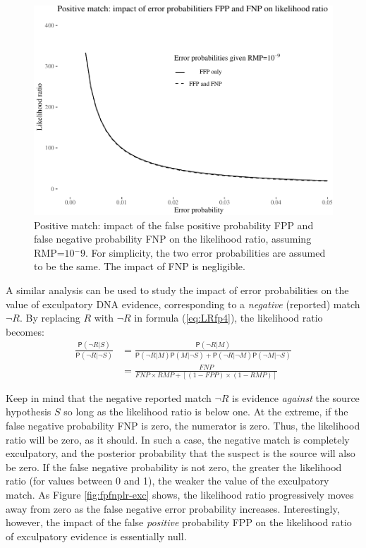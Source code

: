 \documentclass[
  10pt,
  dvipsnames,enabledeprecatedfontcommands]{scrartcl}
\newcommand{\n}{\neg}
\newcommand{\pr}[1]{\mathsf{P}(#1)}
\begin{document}
\begin{figure}

\begin{center}\includegraphics[width=1\linewidth]{lr-chapter4_files/figure-latex/fig-fpfnplr-1} \end{center}
\caption{Positive match: impact of the false positive probability FPP and false negative probability FNP on the likelihood ratio, assuming RMP=$10{^-9}$. For simplicity, the two error probabilities are assumed to be the same. The impact of FNP is negligible.}
\label{fig:fpfnplr}
\end{figure}

A similar analysis can be used to study the impact of error
probabilities on the value of exculpatory DNA evidence, corresponding to
a \textit{negative} (reported) match \(\neg R\). By replacing \(R\) with
\(\neg R\) in formula (\ref{eq:LRfp4}), the likelihood ratio becomes:
\begin{align}
\label{eq:LR-match-exc}
\frac{\pr{\neg R \vert S}}{\pr{\neg R \vert \neg S}} & = 
\frac{\pr{\neg R \vert M}}{\pr{\neg R \vert M }\pr{M \vert \n S} + \pr{\neg R \vert \n M}\pr{\n M \vert \n S}}\\
& = \frac{FNP}{FNP\times RMP + [(1-FPP) \times (1-RMP)]}
\end{align}

\noindent Keep in mind that the negative reported match \(\neg R\) is
evidence \textit{against} the source hypothesis \(S\) so long as the
likelihood ratio is below one. At the extreme, if the false negative
probability FNP is zero, the numerator is zero. Thus, the likelihood
ratio will be zero, as it should. In such a case, the negative match is
completely exculpatory, and the posterior probability that the suspect
is the source will also be zero. If the false negative probability is
not zero, the greater the likelihood ratio (for values between 0 and 1),
the weaker the value of the exculpatory match. As Figure
\ref{fig:fpfnplr-exc} shows, the likelihood ratio progressively moves
away from zero as the false negative error probability increases.
Interestingly, however, the impact of the false \textit{positive}
probability FPP on the likelihood ratio of exculpatory evidence is
essentially null.
\end{document}
